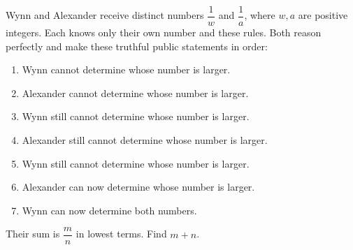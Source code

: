 Wynn and Alexander receive distinct numbers $\dfrac{1}{w}$ and $\dfrac{1}{a}$, where $w,a$ are positive integers. Each knows only their own number and these rules. Both reason perfectly and make these truthful public statements in order:
\begin{enumerate}
\item Wynn cannot determine whose number is larger.
\item Alexander cannot determine whose number is larger.
\item Wynn still cannot determine whose number is larger.
\item Alexander still cannot determine whose number is larger.
\item Wynn still cannot determine whose number is larger.
\item Alexander can now determine whose number is larger.
\item Wynn can now determine both numbers.
\end{enumerate}
Their sum is $\dfrac{m}{n}$ in lowest terms. Find $m+n$.
